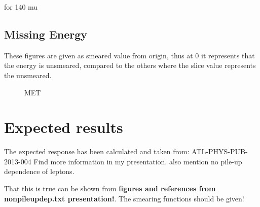for 140 mu

\newpage
\subsection{Missing Energy}
These figures are given as smeared value from origin, thus at 0 it represents that the energy is unsmeared, compared to the others where the slice value represents the unsmeared. 
 \begin{figure}[H] %
    \hfill
        \hfill
   \caption{MET}
    \label{fig:MET}
  \end{figure}

\section{Expected results}\label{cha:vali:sec:expr}

The expected response has been calculated and taken from: ATL-PHYS-PUB-2013-004
Find more information in my presentation. also mention no pile-up dependence of leptons.


That this is true can be shown from \textbf{figures and references from nonpileupdep.txt presentation!}. The smearing functions should be given! 

